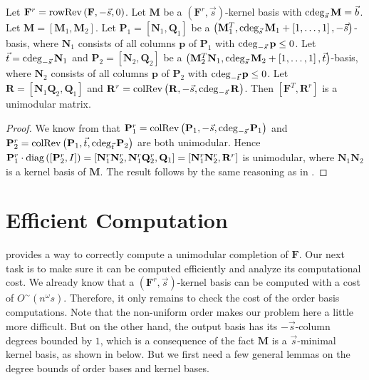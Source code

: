 \begin{lem}
\label{lem:unimodularComputationByRows}Let $\mathbf{F}^{r}=\operatorname{rowRev}\left(\mathbf{F},-\vec{s},0\right)$.
Let $\mathbf{M}$ be a $(\mathbf{F}^{r},\vec{s})$-kernel basis with
$\cdeg_{\vec{s}}\mathbf{M}=\vec{b}$. Let $\mathbf{M}=\left[\mathbf{M}_{1},\mathbf{M}_{2}\right]$.
Let $\mathbf{P}_{1}=\left[\mathbf{N}_{1},\mathbf{Q}_{1}\right]$ be
a $\left(\mathbf{M}_{1}^{T},\cdeg_{\vec{s}}\mathbf{M}_{1}+\left[1,\dots,1\right],-\vec{s}\right)$-basis,
where $\mathbf{N}_{1}$ consists of all columns $\mathbf{p}$ of $\mathbf{P}_{1}$
with $\cdeg_{-\vec{s}}\mathbf{p}\le0$. Let $\vec{t}=\cdeg_{-\vec{s}}\mathbf{N}_{1}$
and $\mathbf{P}_{2}=\left[\mathbf{N}_{2},\mathbf{Q}_{2}\right]$ be
a $\left(\mathbf{M}_{2}^{T}\mathbf{N}_{1},\cdeg_{\vec{s}}\mathbf{M}_{2}+\left[1,\dots,1\right],\vec{t}\right)$-basis,
where $\mathbf{N}_{2}$ consists of all columns $\mathbf{p}$ of $\mathbf{P}_{2}$
with $\cdeg_{-\vec{t}}\mathbf{p}\le0$. Let $\mathbf{R}=\left[\mathbf{N}_{1}\mathbf{Q}_{2},\mathbf{Q}_{1}\right]$
and $\mathbf{R}^{r}=\colRev\left(\mathbf{R},-\vec{s},\cdeg_{-\vec{s}}\mathbf{R}\right)$.
Then $\left[\mathbf{F}^{T},\mathbf{R}^{r}\right]$ is a unimodular
matrix.\end{lem}
\begin{proof}
We know from  that $\mathbf{P}_{1}^{r}=\colRev\left(\mathbf{P}_{1},-\vec{s},\cdeg_{-\vec{s}}\mathbf{P}_{1}\right)$
and $\mathbf{P}_{2}^{r}=\colRev\left(\mathbf{P}_{1},\vec{t},\cdeg_{\vec{t}}\mathbf{P}_{2}\right)$
are both unimodular. Hence $\mathbf{P}_{1}^{r}\cdot\mbox{diag}\left(\left[\mathbf{P}_{2}^{r},I\right]\right)=\left[\mathbf{N}_{1}^{r}\mathbf{N}_{2}^{r},\mathbf{N}_{1}^{r}\mathbf{Q}_{2}^{r},\mathbf{Q}_{1}\right]=\left[\mathbf{N}_{1}^{r}\mathbf{N}_{2}^{r},\mathbf{R}^{r}\right]$
is unimodular, where\textbf{ $\mathbf{N}_{1}\mathbf{N}_{2}$ }is a
kernel basis of $\mathbf{M}$. The result follows by the same reasoning
as in .
\end{proof}

\section{Efficient Computation}

 provides a way to correctly
compute a unimodular completion of $\mathbf{F}$. Our next task is
to make sure it can be computed efficiently and analyze its computational
cost. We already know that a $(\mathbf{F}^{r},\vec{s})$-kernel basis
can be computed with a cost of $O^{\sim}\left(n^{\omega}s\right)$.
Therefore, it only remains to check the cost of the order basis computations.
Note that the non-uniform order makes our problem here a little more
difficult. But on the other hand, the output basis has its $-\vec{s}$-column
degrees bounded by $1$, which is a consequence of the fact $\mathbf{M}$
is a $\vec{s}$-minimal kernel basis, as shown in 
below. But we first need a few general lemmas on the degree bounds
of order bases and kernel bases.

